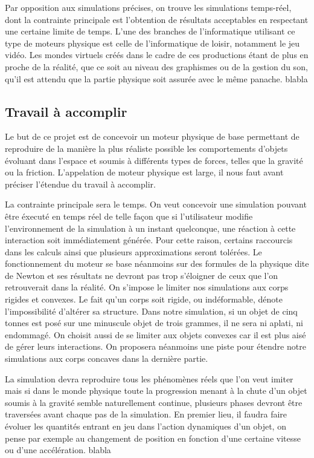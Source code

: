 Par opposition aux simulations précises, on trouve les simulations temps-réel, dont la contrainte principale est l'obtention de résultats acceptables en respectant une certaine limite de temps. L'une des branches de l'informatique utilisant ce type de moteurs physique est celle de l'informatique de loisir, notamment le jeu vidéo. Les mondes virtuels créés dans le cadre de ces productions étant de plus en proche de la réalité, que ce soit au niveau des graphismes ou de la gestion du son, qu'il est attendu que la partie physique soit assurée avec le même panache. blabla

\subsection{Travail à accomplir}

Le but de ce projet est de concevoir un moteur physique de base permettant de reproduire de la manière la plus réaliste possible les comportements d'objets évoluant dans l'espace et soumis à différents types de forces, telles que la gravité ou la friction. L'appelation de moteur physique est large, il nous faut avant préciser l'étendue du travail à accomplir.

La contrainte principale sera le temps. On veut concevoir une simulation pouvant être éxecuté en temps réel de telle façon que si l'utilisateur modifie l'environnement de la simulation à un instant quelconque, une réaction à cette interaction soit immédiatement générée. Pour cette raison, certains raccourcis dans les calculs ainsi que plusieurs approximations seront tolérées. Le fonctionnement du moteur se base néanmoins sur des formules de la physique dite de Newton et ses résultats ne devront pas trop s'éloigner de ceux que l'on retrouverait dans la réalité. On s'impose le limiter nos simulations aux corps rigides et convexes. Le fait qu'un corps soit rigide, ou indéformable, dénote l'impossibilité d'altérer sa structure. Dans notre simulation, si un objet de cinq tonnes est posé sur une minuscule objet de trois grammes, il ne sera ni aplati, ni endommagé. On choisit aussi de se limiter aux objets convexes car il est plus aisé de gérer leurs interactions. On proposera néanmoins une piste pour étendre notre simulations aux corps concaves dans la dernière partie.

La simulation devra reproduire tous les phénomènes réels que l'on veut imiter mais si dans le monde physique toute la progression menant à la chute d'un objet soumis à la gravité semble naturellement continue, plusieurs phases devront être traversées avant chaque pas de la simulation. En premier lieu, il faudra faire évoluer les quantités entrant en jeu dans l'action dynamiques d'un objet, on pense par exemple au changement de position en fonction d'une certaine vitesse ou d'une accélération.  blabla

